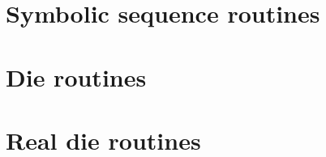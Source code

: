 %  
%  
%  
%  
%  
%  
%  
%  
%  
%  
%  
\section{Symbolic sequence routines}
  \label{sec:src_sym}
  
  
\section{Die routines}
  \label{sec:src_die}
  
  
\section{Real die routines}
  \label{sec:src_rdie}
  
  
